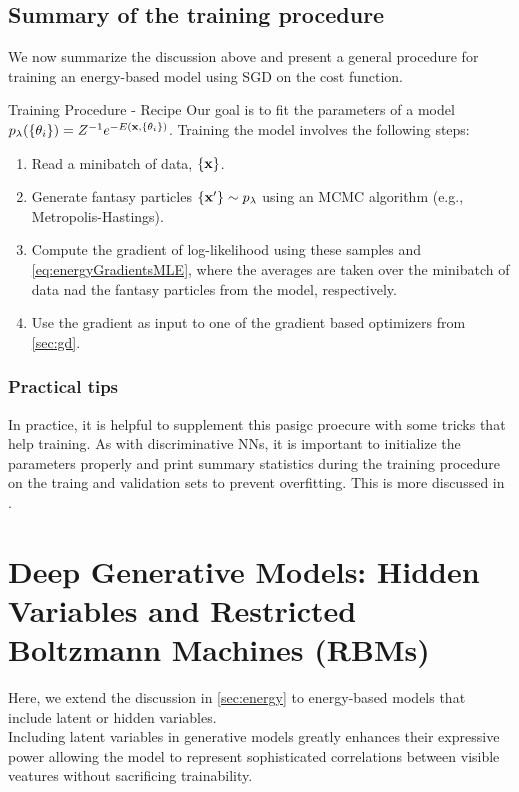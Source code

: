 \subsection{Summary of the training procedure}
\label{subsec:energyTrainingProcedure}
We now summarize the discussion above and present a general procedure for training an energy-based model using SGD on the cost function.
\begin{mybox}{Training Procedure - Recipe}
	Our goal is to fit the parameters of a model $p_{\lambda}(\{\theta_i\}) = Z^{-1} e^{-E(\mathbf{x},\{\theta_i\})}$. Training the model involves the following steps:
		\begin{enumerate}
			\item Read a minibatch of data, $\{\mathbf{x}\}$.
			\item Generate fantasy particles $\{\mathbf{x}^\prime\} \sim p_\lambda$ using an MCMC algorithm (e.g., Metropolis-Hastings).
			\item Compute the gradient of log-likelihood using these samples and \ref{eq:energyGradientsMLE}, where the averages are taken over the minibatch of data nad the fantasy particles from the model, respectively.
			\item Use the gradient as input to one of the gradient based optimizers from \ref{sec:gd}.
		\end{enumerate}
\end{mybox}
\subsubsection{Practical tips}
In practice, it is helpful to supplement this pasigc proecure with some tricks that help training. As with discriminative NNs, it is important to initialize the parameters properly and print summary statistics during the training procedure on the traing and validation sets to prevent overfitting. This is more discussed in .











\section{Deep Generative Models: Hidden Variables and Restricted Boltzmann Machines (RBMs)}
\label{sec:deepGenerative}
Here, we extend the discussion in \ref{sec:energy} to energy-based models that include latent or hidden variables.\\
Including latent variables in generative models greatly enhances their expressive power allowing the model to represent sophisticated correlations between visible veatures without sacrificing trainability.

